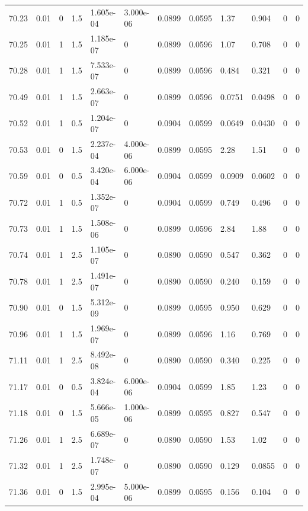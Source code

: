 \documentclass[preview]{standalone}
\begin{document}
{{{{{{{{{{{{{{\begin{tabular}{L{1.2cm}C{1.2cm} C{0.3cm}C{0.5cm} C{1.4cm}C{1.4cm} C{1.4cm}C{1.4cm} C{1.6cm}C{1.6cm} C{1.6cm}C{1.6cm}}
  70.23  &  0.01  & 0     & 1.5 &  1.605e-04  & 3.000e-06  &  0.0899&   0.0595& 1.37 & 0.904   &  0 & 0  \\ 
  70.25  &  0.01  & 1     & 1.5 &  1.185e-07  & 0  &  0.0899&   0.0596& 1.07 & 0.708   &  0 & 0  \\ 
  70.28  &  0.01  & 1     & 1.5 &  7.533e-07  & 0  &  0.0899&   0.0596& 0.484 & 0.321   &  0 & 0  \\ 
  70.49  &  0.01  & 1     & 1.5 &  2.663e-07  & 0  &  0.0899&   0.0596& 0.0751 & 0.0498   &  0 & 0  \\ 
  70.52  &  0.01  & 1     & 0.5 &  1.204e-07  & 0  &  0.0904&   0.0599& 0.0649 & 0.0430   &  0 & 0  \\ 
  70.53  &  0.01  & 0     & 1.5 &  2.237e-04  & 4.000e-06  &  0.0899&   0.0595& 2.28 & 1.51   &  0 & 0  \\ 
  70.59  &  0.01  & 0     & 0.5 &  3.420e-04  & 6.000e-06  &  0.0904&   0.0599& 0.0909 & 0.0602   &  0 & 0  \\ 
  70.72  &  0.01  & 1     & 0.5 &  1.352e-07  & 0  &  0.0904&   0.0599& 0.749 & 0.496   &  0 & 0  \\ 
  70.73  &  0.01  & 1     & 1.5 &  1.508e-06  & 0  &  0.0899&   0.0596& 2.84 & 1.88   &  0 & 0  \\ 
  70.74  &  0.01  & 1     & 2.5 &  1.105e-07  & 0  &  0.0890&   0.0590& 0.547 & 0.362   &  0 & 0  \\ 
  70.78  &  0.01  & 1     & 2.5 &  1.491e-07  & 0  &  0.0890&   0.0590& 0.240 & 0.159   &  0 & 0  \\ 
  70.90  &  0.01  & 0     & 1.5 &  5.312e-09  & 0  &  0.0899&   0.0595& 0.950 & 0.629   &  0 & 0  \\ 
  70.96  &  0.01  & 1     & 1.5 &  1.969e-07  & 0  &  0.0899&   0.0596& 1.16 & 0.769   &  0 & 0  \\ 
  71.11  &  0.01  & 1     & 2.5 &  8.492e-08  & 0  &  0.0890&   0.0590& 0.340 & 0.225   &  0 & 0  \\ 
  71.17  &  0.01  & 0     & 0.5 &  3.824e-04  & 6.000e-06  &  0.0904&   0.0599& 1.85 & 1.23   &  0 & 0  \\ 
  71.18  &  0.01  & 0     & 1.5 &  5.666e-05  & 1.000e-06  &  0.0899&   0.0595& 0.827 & 0.547   &  0 & 0  \\ 
  71.26  &  0.01  & 1     & 2.5 &  6.689e-07  & 0  &  0.0890&   0.0590& 1.53 & 1.02   &  0 & 0  \\ 
  71.32  &  0.01  & 1     & 2.5 &  1.748e-07  & 0  &  0.0890&   0.0590& 0.129 & 0.0855   &  0 & 0  \\ 
  71.36  &  0.01  & 0     & 1.5 &  2.995e-04  & 5.000e-06  &  0.0899&   0.0595& 0.156 & 0.104   &  0 & 0  \\ 

\end{tabular}}}}}}}}}}}}}}}
\end{document}
